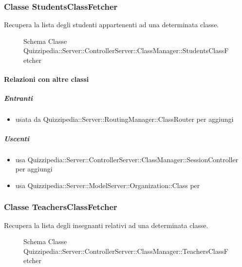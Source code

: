 \subsubsection{Classe StudentsClassFetcher}
Recupera la lista degli studenti appartenenti ad una determinata classe.
\begin{figure}[H]
\centering
\noindent{}
\caption[Schema Classe StudentsClassFetcher]{Schema Classe Quizzipedia::Server::ControllerServer::ClassManager::StudentsClassFetcher}
\end{figure}
\paragraph{Relazioni con altre classi}
\subparagraph{Entranti}
\begin{itemize}
\item usata da Quizzipedia::Server::RoutingManager::ClassRouter per aggiungi
\end{itemize}
\subparagraph{Uscenti}
\begin{itemize}
\item usa Quizzipedia::Server::ControllerServer::ClassManager::SessionController per aggiungi
\item usa Quizzipedia::Server::ModelServer::Organization::Class per 
\end{itemize}
\subsubsection{Classe TeachersClassFetcher}
Recupera la lista degli insegnanti relativi ad una determinata classe.
\begin{figure}[H]
\centering
\noindent{}
\caption[Schema Classe TeachersClassFetcher]{Schema Classe Quizzipedia::Server::ControllerServer::ClassManager::TeachersClassFetcher}
\end{figure}

